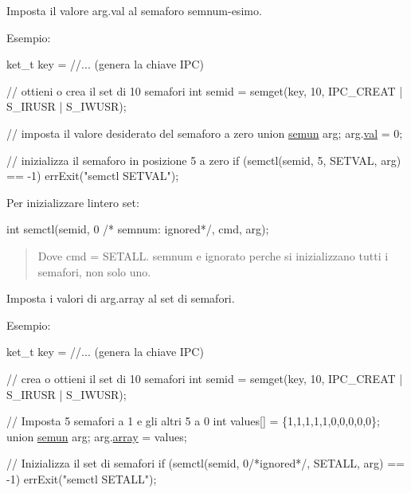 Imposta il valore arg.\+val al semaforo semnum-\/esimo.

Esempio\+: 
\begin{DoxyCode}
ket\_t key = \textcolor{comment}{//... (genera la chiave IPC)}

\textcolor{comment}{// ottieni o crea il set di 10 semafori}
\textcolor{keywordtype}{int} semid = semget(key, 10, IPC\_CREAT | S\_IRUSR | S\_IWUSR);

\textcolor{comment}{// imposta il valore desiderato del semaforo a zero}
\textcolor{keyword}{union }\hyperlink{unionsemun}{semun} arg;
arg.\hyperlink{unionsemun_ac6121ecb6d04a024e07e12bd71b94031}{val} = 0;

\textcolor{comment}{// inizializza il semaforo in posizione 5 a zero}
\textcolor{keywordflow}{if} (semctl(semid, 5, SETVAL, arg) == -1)
    errExit(\textcolor{stringliteral}{"semctl SETVAL"});
\end{DoxyCode}


Per inizializzare l\textquotesingle{}intero set\+: 
\begin{DoxyCode}
\textcolor{keywordtype}{int} semctl(semid, 0 \textcolor{comment}{/* semnum: ignored*/}, cmd, arg);
\end{DoxyCode}
 \begin{quote}
Dove {\ttfamily cmd} = {\ttfamily S\+E\+T\+A\+LL}. {\ttfamily semnum} e\textquotesingle{} ignorato perche\textquotesingle{} si inizializzano tutti i semafori, non solo uno. \end{quote}


Imposta i valori di arg.\+array al set di semafori.

Esempio\+: 
\begin{DoxyCode}
ket\_t key = \textcolor{comment}{//... (genera la chiave IPC)}

\textcolor{comment}{// crea o ottieni il set di 10 semafori}
\textcolor{keywordtype}{int} semid = semget(key, 10, IPC\_CREAT | S\_IRUSR | S\_IWUSR);

\textcolor{comment}{// Imposta 5 semafori a 1 e gli altri 5 a 0}
\textcolor{keywordtype}{int} values[] = \{1,1,1,1,1,0,0,0,0,0\};
\textcolor{keyword}{union }\hyperlink{unionsemun}{semun} arg;
arg.\hyperlink{unionsemun_aca23b8e730a0553205813c0cb7692b54}{array} = values;

\textcolor{comment}{// Inizializza il set di semafori}
\textcolor{keywordflow}{if} (semctl(semid, 0\textcolor{comment}{/*ignored*/}, SETALL, arg) == -1)
    errExit(\textcolor{stringliteral}{"semctl SETALL"});
\end{DoxyCode}



